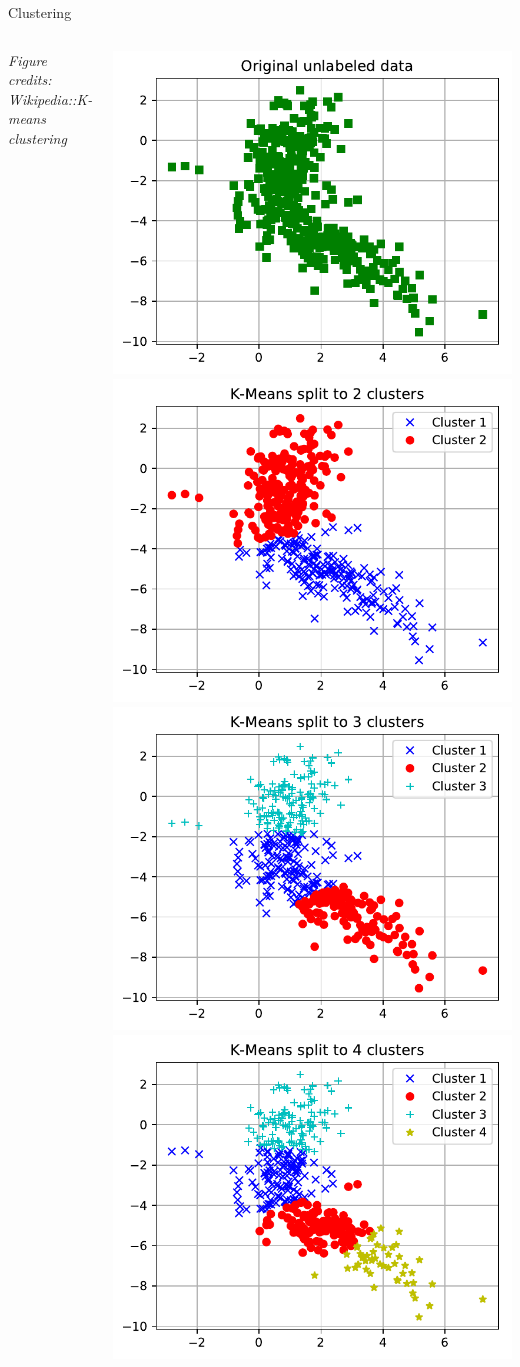 \documentclass[10pt, aspectratio=169]{beamer} %
\begin{document}
\begin{frame}[fragile, allowframebreaks=0.8]{Clustering}
\begin{columns}
			\emph{\scriptsize Figure credits: Wikipedia::K-means clustering}
		\begin{center}
			\includegraphics[width=0.5\columnwidth]{kmeans_orig.pdf}
			\includegraphics[width=0.5\columnwidth]{kmeans_2.pdf}\\
			\includegraphics[width=0.5\columnwidth]{kmeans_3.pdf}
			\includegraphics[width=0.5\columnwidth]{kmeans_4.pdf}\\

\end{center}
\end{columns}
\end{frame}
\end{document}
